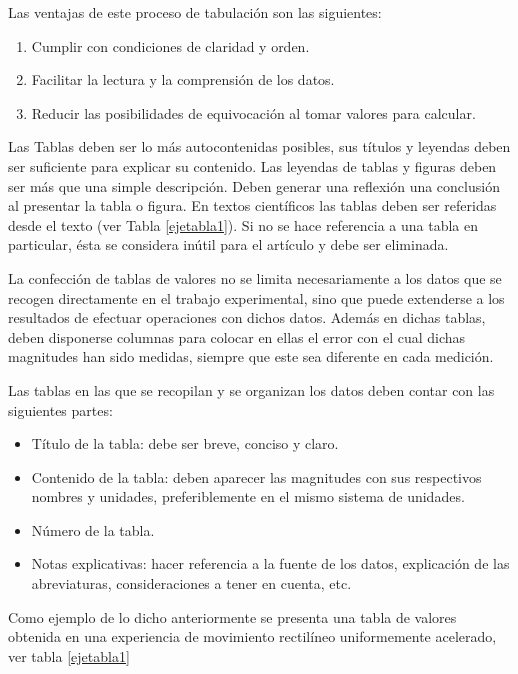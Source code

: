 Las ventajas de este proceso de tabulaci\'on son las siguientes:
\begin{enumerate}
\item Cumplir con condiciones de claridad y orden.
\item Facilitar la lectura y la comprensi\'on de los datos.
\item Reducir las posibilidades de equivocaci\'on al tomar valores para calcular.
\end{enumerate}

Las Tablas deben ser lo m\'as autocontenidas posibles, sus t\'itulos y  leyendas deben ser suficiente para explicar su contenido. Las leyendas de tablas y figuras deben ser m\'as que una simple descripci\'on. Deben generar una reflexi\'on una conclusi\'on al presentar la tabla o figura. En textos cient\'ificos las tablas deben ser referidas desde el texto (ver Tabla \ref{ejetabla1}). Si no se hace referencia a una tabla en particular, \'esta se considera in\'util para el art\'iculo y debe ser eliminada.

La confecci\'on de tablas de valores no se limita necesariamente a los datos que se recogen directamente en el trabajo experimental, sino que puede extenderse a los resultados de efectuar operaciones con dichos datos. Adem\'as en dichas tablas, deben disponerse columnas para colocar en ellas el error con el cual dichas magnitudes han sido medidas, siempre que este sea diferente en cada medici\'on.

Las tablas en las que se recopilan y se organizan los datos deben contar con las siguientes partes:
\begin{itemize}
\item T\'itulo de la tabla: debe ser breve, conciso y claro.
\item Contenido de la tabla:  deben aparecer las magnitudes con sus respectivos nombres y unidades, preferiblemente  en el mismo sistema de unidades.
\item N\'umero de la tabla.
\item Notas explicativas: hacer referencia a la fuente de los datos, explicaci\'on de las abreviaturas, consideraciones a tener en cuenta, etc. 
\end{itemize}

Como ejemplo de lo dicho anteriormente se presenta una tabla de valores obtenida en una experiencia de movimiento rectil\'ineo uniformemente acelerado, ver tabla \ref{ejetabla1}

